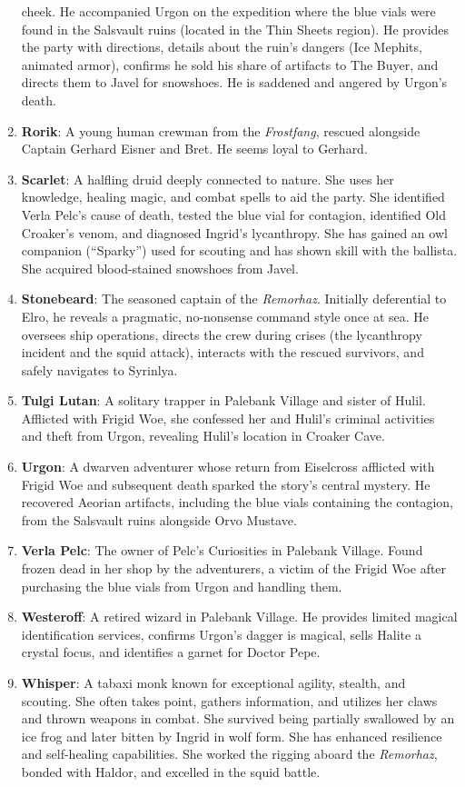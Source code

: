 \documentclass[
  letterpaper,12pt,twoside,twocolumn,openany,
  nodeprecatedcode,bg=full]{dndbook}
\begin{document}
\begin{enumerate}
  cheek. He accompanied Urgon on the expedition where the blue vials
  were found in the Salsvault ruins (located in the Thin Sheets region).
  He provides the party with directions, details about the ruin's
  dangers (Ice Mephits, animated armor), confirms he sold his share of
  artifacts to The Buyer, and directs them to Javel for snowshoes. He is
  saddened and angered by Urgon's death.
\item
  \textbf{Rorik}: A young human crewman from the \emph{Frostfang},
  rescued alongside Captain Gerhard Eisner and Bret. He seems loyal to
  Gerhard.
\item
  \textbf{Scarlet}: A halfling druid deeply connected to nature. She
  uses her knowledge, healing magic, and combat spells to aid the party.
  She identified Verla Pelc's cause of death, tested the blue vial for
  contagion, identified Old Croaker's venom, and diagnosed Ingrid's
  lycanthropy. She has gained an owl companion (``Sparky'') used for
  scouting and has shown skill with the ballista. She acquired
  blood-stained snowshoes from Javel.
\item
  \textbf{Stonebeard}: The seasoned captain of the \emph{Remorhaz}.
  Initially deferential to Elro, he reveals a pragmatic, no-nonsense
  command style once at sea. He oversees ship operations, directs the
  crew during crises (the lycanthropy incident and the squid attack),
  interacts with the rescued survivors, and safely navigates to
  Syrinlya.
\item
  \textbf{Tulgi Lutan}: A solitary trapper in Palebank Village and
  sister of Hulil. Afflicted with Frigid Woe, she confessed her and
  Hulil's criminal activities and theft from Urgon, revealing Hulil's
  location in Croaker Cave.
\item
  \textbf{Urgon}: A dwarven adventurer whose return from Eiselcross
  afflicted with Frigid Woe and subsequent death sparked the story's
  central mystery. He recovered Aeorian artifacts, including the blue
  vials containing the contagion, from the Salsvault ruins alongside
  Orvo Mustave.
\item
  \textbf{Verla Pelc}: The owner of Pelc's Curiosities in Palebank
  Village. Found frozen dead in her shop by the adventurers, a victim of
  the Frigid Woe after purchasing the blue vials from Urgon and handling
  them.
\item
  \textbf{Westeroff}: A retired wizard in Palebank Village. He provides
  limited magical identification services, confirms Urgon's dagger is
  magical, sells Halite a crystal focus, and identifies a garnet for
  Doctor Pepe.
\item
  \textbf{Whisper}: A tabaxi monk known for exceptional agility,
  stealth, and scouting. She often takes point, gathers information, and
  utilizes her claws and thrown weapons in combat. She survived being
  partially swallowed by an ice frog and later bitten by Ingrid in wolf
  form. She has enhanced resilience and self-healing capabilities. She
  worked the rigging aboard the \emph{Remorhaz}, bonded with Haldor, and
  excelled in the squid battle.
\end{enumerate}
\end{document}
